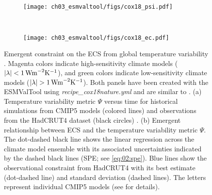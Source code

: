 \begin{figure}[t]
  \centering
  \begin{subfigure}[b]{\SubfigureWidth{}}
    \texttt{[image: ch03\_esmvaltool/figs/cox18\_psi.pdf]}
    \caption{}
    \label{fig:03:cox18:a}
  \end{subfigure}
  ~
  \begin{subfigure}[b]{\SubfigureWidth{}}
    \texttt{[image: ch03\_esmvaltool/figs/cox18\_ec.pdf]}
    \caption{}
    \label{fig:03:cox18:b}
  \end{subfigure}
  \caption[
    Emergent constraint on the \acf{ECS} from global temperature variability.
  ]{
    Emergent constraint on the \acf{ECS} from global temperature variability
    \autocite{Cox2018}. Magenta colors indicate high-sensitivity climate models
    ($\abs*{\lambda} < 1 \unit{W m^{-2} K^{-1}}$), and green colors indicate
    low-sensitivity climate models ($\abs*{\lambda} > 1 \unit{W m^{-2}
      K^{-1}}$). Both panels have been created with the \acs{ESMValTool} using
    \emph{recipe\_cox18nature.yml} and are similar to \textcite{Cox2018}. (a)
    Temperature variability metric $\Psi$ versus time for historical
    simulations from \acs{CMIP}5 models (colored lines) and observations from
    the HadCRUT4 dataset (black circles) \autocite{Morice2012}. (b) Emergent
    relationship between \acs{ECS} and the temperature variability metric
    $\Psi$. The dot-dashed black line shows the linear regression across the
    climate model ensemble with its associated uncertainties indicated by the
    dashed black lines (\acl{SPE}; see \cref{eq:02:spe}). Blue lines show the
    observational constraint from HadCRUT4 with its best estimate (dot-dashed
    line) and standard deviation (dashed lines). The letters represent
    individual \acs{CMIP}5 models (see \textcite{Cox2018} for details).
  }
  \label{fig:03:cox18}
\end{figure}

